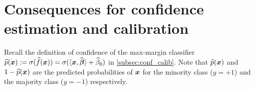 \section{Consequences for confidence estimation and calibration} \label{sec:calibration}



Recall the definition of confidence of the max-margin classifier $\widehat p(\text{\boldmath $x$}) := \sigma ( \widehat f(\text{\boldmath $x$}) ) = 
        \sigma( \langle \text{\boldmath $x$}, \widehat{{\boldsymbol{\beta}}} \rangle + \widehat\beta_0 )$ in \cref{subsec:conf_calib}.
Note that $\widehat p(\text{\boldmath $x$})$ and $1 - \widehat p(\text{\boldmath $x$})$ are the predicted probabilities of $\text{\boldmath $x$}$ for the minority class ($y = +1$) and the majority class ($y = -1$) respectively. 

